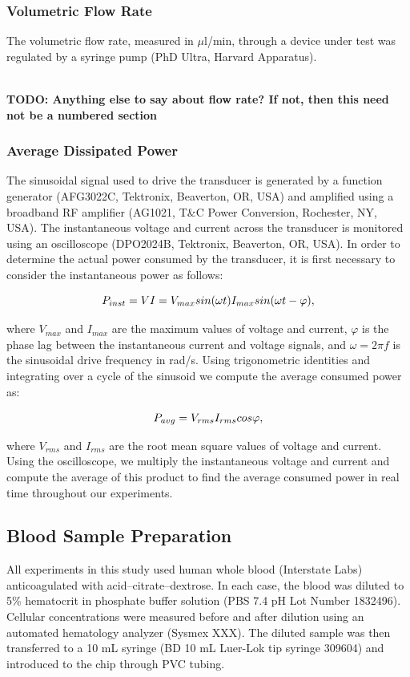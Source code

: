 \subsubsection{Volumetric Flow Rate}

The volumetric flow rate, measured in $\mu$l/min, through a device under test was regulated by a syringe pump (PhD Ultra, Harvard Apparatus).

\textbf{\\TODO: Anything else to say about flow rate? If not, then this need not be a numbered section}

\subsubsection{Average Dissipated Power}
\label{sssec:power}

The sinusoidal signal used to drive the transducer is generated by a function generator (AFG3022C, Tektronix, Beaverton, OR, USA) and amplified using a broadband RF amplifier (AG1021, T\&C Power Conversion, Rochester, NY, USA). The instantaneous voltage and current across the transducer is monitored using an oscilloscope (DPO2024B, Tektronix, Beaverton, OR, USA). In order to determine the actual power consumed by the transducer, it is first necessary to consider the instantaneous power as follows:

\begin{equation}
\label{eqn:instpower}
\hfill P_{inst} = VI = V_{max}sin(\omega t) I_{max} sin(\omega t-\varphi),\hfill
\end{equation}

\noindent where $V_{max}$ and $I_{max}$ are the maximum values of voltage and current, $\varphi$ is the phase lag between the instantaneous current and voltage signals, and $\omega=2\pi f$ is the sinusoidal drive frequency in rad/s. Using trigonometric identities and integrating over a cycle of the sinusoid we compute the average consumed power as:

\begin{equation}
\label{eqn:avgpower}
\hfill P_{avg} = V_{rms}I_{rms}cos\varphi,\hfill
\end{equation}

\noindent where $V_{rms}$ and $I_{rms}$ are the root mean square values of voltage and current. Using the oscilloscope, we multiply the instantaneous voltage and current and compute the average of this product to find the average consumed power in real time throughout our experiments.
\subsection{Blood Sample Preparation}
All experiments in this study used human whole blood (Interstate Labs) anticoagulated with acid–citrate–dextrose. In each case, the blood was diluted to 5\% hematocrit in phosphate buffer solution (PBS 7.4 pH Lot Number 1832496). Cellular concentrations were measured before and after dilution using an automated hematology analyzer (Sysmex XXX). The diluted sample was then transferred to a 10 mL syringe (BD 10 mL Luer-Lok tip syringe 309604) and introduced to the chip through PVC tubing. 

